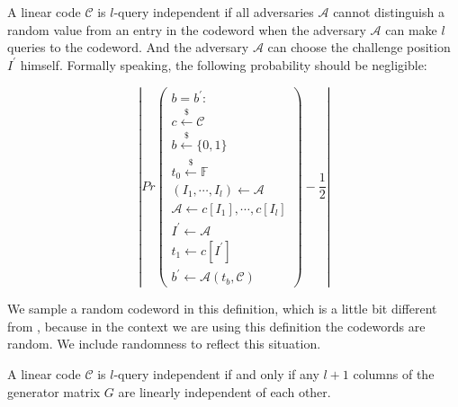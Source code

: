 \begin{definition}
\label{def:l-ind-codeword}
A linear code $\mathcal{C}$ is $l$-query independent if all adversaries $\mathcal{A}$ cannot distinguish a random value from an entry in the codeword when the adversary $\mathcal{A}$ can make $l$ queries to the codeword. And the adversary $\mathcal{A}$ can choose the challenge position $I^\prime$ himself. Formally speaking, the following probability should be negligible:


$$
\left \lvert
Pr
\begin{pmatrix}
 b = b^\prime : \\
 c \overset{{\scriptscriptstyle\$}}{\leftarrow} \mathcal{C} \\
 b \overset{{\scriptscriptstyle\$}}{\leftarrow} \{0, 1\} \\
 t_0 \overset{{\scriptscriptstyle\$}}{\leftarrow} \mathbb{F} \\
 (I_1, \cdots, I_l) \leftarrow \mathcal{A} \\
 \mathcal{A} \leftarrow c[I_1], \cdots, c[I_l] \\
 I^\prime \leftarrow \mathcal{A} \\
 t_1 \leftarrow c[I^\prime] \\
 b^\prime \leftarrow \mathcal{A}(t_b, \mathcal{C})
\end{pmatrix}
- \frac{1}{2}
\right \rvert
$$
\end{definition}

We sample a random codeword in this definition, which is a little bit different from \cite{BCL22}, because in the context we are using this definition the codewords are random. We include randomness to reflect this situation.

\begin{lemma}
\label{lemma:lquery-zk}

A linear code $\mathcal{C}$ is $l$-query independent if and only if any $l+1$ columns of the generator matrix $G$ are linearly independent of each other.

\end{lemma}

